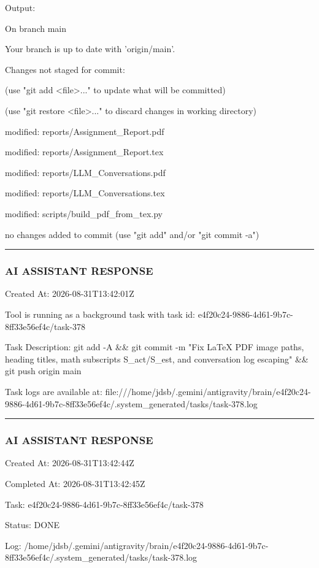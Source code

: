 \documentclass[11pt,a4paper]{article}
\begin{document}
{{{Output:

On branch main

Your branch is up to date with 'origin/main'.


Changes not staged for commit:

(use "git add <file>..." to update what will be committed)

(use "git restore <file>..." to discard changes in working directory)

modified:   reports/Assignment\_Report.pdf

modified:   reports/Assignment\_Report.tex

modified:   reports/LLM\_Conversations.pdf

modified:   reports/LLM\_Conversations.tex

modified:   scripts/build\_pdf\_from\_tex.py


no changes added to commit (use "git add" and/or "git commit -a")


\hrule

\subsubsection{AI ASSISTANT RESPONSE}

Created At: 2026-08-31T13:42:01Z

Tool is running as a background task with task id: e4f20c24-9886-4d61-9b7c-8ff33e56ef4c/task-378

Task Description: git add -A \&\& git commit -m "Fix LaTeX PDF image paths, heading titles, math subscripts S\_act/S\_est, and conversation log escaping" \&\& git push origin main

Task logs are available at: file:///home/jdsb/.gemini/antigravity/brain/e4f20c24-9886-4d61-9b7c-8ff33e56ef4c/.system\_generated/tasks/task-378.log


\hrule

\subsubsection{AI ASSISTANT RESPONSE}

Created At: 2026-08-31T13:42:44Z

Completed At: 2026-08-31T13:42:45Z

Task: e4f20c24-9886-4d61-9b7c-8ff33e56ef4c/task-378

Status: DONE

Log: /home/jdsb/.gemini/antigravity/brain/e4f20c24-9886-4d61-9b7c-8ff33e56ef4c/.system\_generated/tasks/task-378.log

}}}
\end{document}
